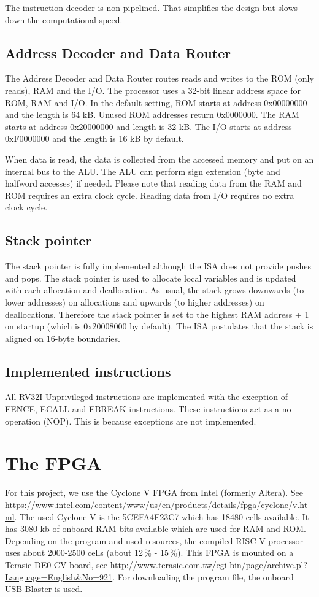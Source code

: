 \documentclass[12pt]{article}
\begin{document}
The instruction decoder is non-pipelined. That simplifies the design but slows down the computational speed.

\subsection{Address Decoder and Data Router}
\label{sec:addressdecoderanddatarouter}
The Address Decoder and Data Router routes reads and writes to the ROM (only reads), RAM and the I/O. The processor uses a 32-bit linear address space for ROM, RAM and I/O. In the default setting, ROM starts at address 0x00000000 and the length is 64 kB. Unused ROM addresses return 0x0000000. The RAM starts at address 0x20000000 and length is 32 kB. The I/O starts at address 0xF0000000 and the length is 16 kB by default.

When data is read, the data is collected from the accessed memory and put on an internal bus to the ALU. The ALU can perform sign extension (byte and halfword accesses) if needed. Please note that reading data from the RAM and ROM requires an extra clock cycle. Reading data from I/O requires no extra clock cycle.

\subsection{Stack pointer}
The stack pointer is fully implemented although the ISA does not provide pushes and pops. The stack pointer is used to allocate local variables and is updated with each allocation and deallocation. As usual, the stack grows downwards (to lower addresses) on allocations and upwards (to higher addresses) on deallocations. Therefore the stack pointer is set to the highest RAM address + 1 on startup (which is 0x20008000 by default). The ISA postulates that the stack is aligned on 16-byte boundaries.

\subsection{Implemented instructions}
All RV32I Unprivileged instructions are implemented with the exception of FENCE, ECALL and EBREAK instructions. These instructions act as a no-operation (NOP). This is because exceptions are not implemented.

\section{The FPGA}
For this project, we use the Cyclone V FPGA from Intel (formerly Altera). See \url{https://www.intel.com/content/www/us/en/products/details/fpga/cyclone/v.html}.
The used Cyclone V is the 5CEFA4F23C7 which has 18480 cells available. It has 3080 kb of onboard RAM bits available which are used for RAM and ROM. Depending on the program and used resources, the compiled RISC-V processor uses about 2000-2500 cells (about 12\,\% - 15\,\%). This FPGA is mounted on a Terasic DE0-CV board, see \url{http://www.terasic.com.tw/cgi-bin/page/archive.pl?Language=English&No=921}. For downloading the program file, the onboard USB-Blaster is used.
\end{document}
